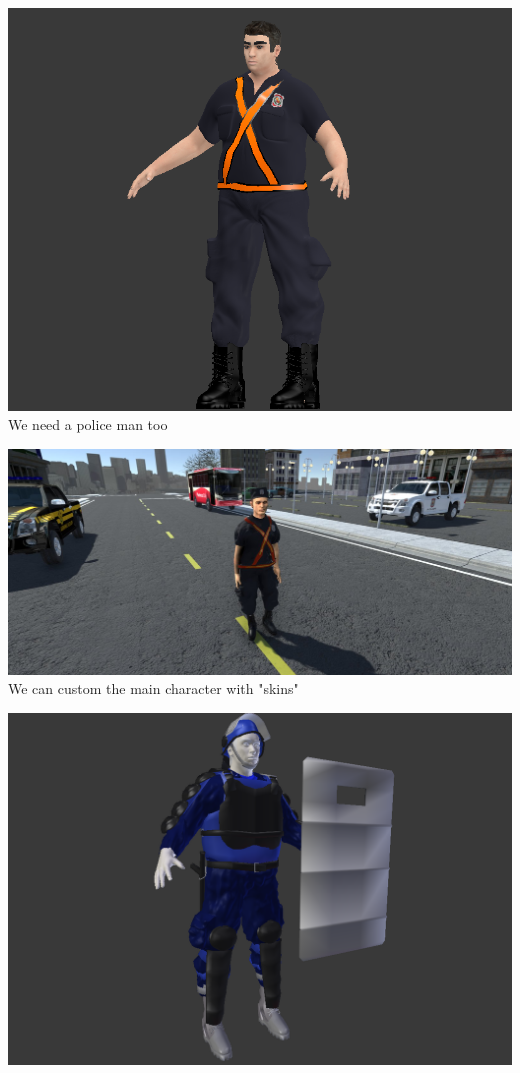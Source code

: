\documentclass{article}
\begin{document}
  \includegraphics[width=\textwidth]{36.png}
  We need a police man too
  
  \includegraphics[width=\textwidth]{56.jpg}
  We can custom the main character with "skins"
  
  \includegraphics[width=\textwidth]{45.png}
\end{document}
